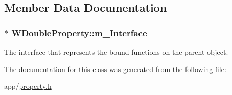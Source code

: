 \subsection{Member Data Documentation}
\hypertarget{class_w_double_property_aa40ee58413b2eb1431bcc98962e59c64}{
\subsubsection[{m\-\_\-\-Interface}]{$\ast$ W\-Double\-Property\-::m\-\_\-\-Interface\hspace{0.3cm}{\ttfamily [protected]}}}\label{class_w_double_property_aa40ee58413b2eb1431bcc98962e59c64}
The interface that represents the bound functions on the parent object. 

The documentation for this class was generated from the following file\-:\begin{DoxyCompactItemize}
\item 
app/\hyperlink{property_8h}{property.\-h}\end{DoxyCompactItemize}
